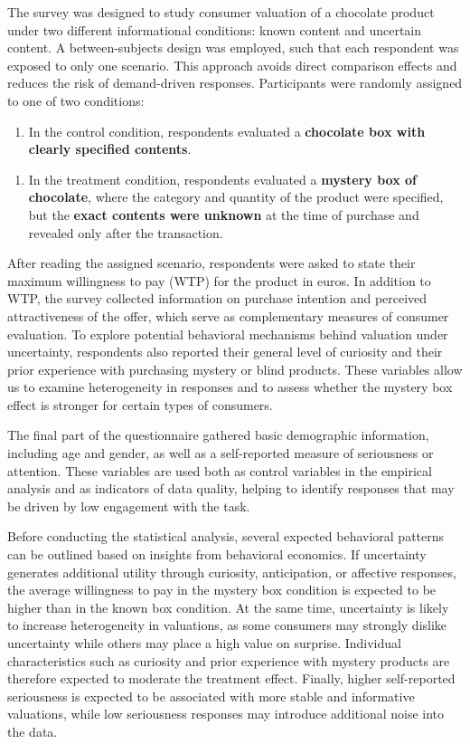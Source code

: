 \documentclass{article}
\begin{document}
The survey was designed to study consumer valuation of a chocolate product under two different informational conditions: known content and uncertain content. A between-subjects design was employed, such that each respondent was exposed to only one scenario. This approach avoids direct comparison effects and reduces the risk of demand-driven responses.
Participants were randomly assigned to one of two conditions: 
\begin{enumerate}
    \item In the control condition, respondents evaluated a \textbf{chocolate box with clearly specified contents}.
\end{enumerate}

\begin{enumerate}
    \item In the treatment condition, respondents evaluated a \textbf{mystery box of chocolate}, where the category and quantity of the product were specified, but the \textbf{exact contents were unknown} at the time of purchase and revealed only after the transaction.
\end{enumerate}

After reading the assigned scenario, respondents were asked to state their maximum willingness to pay (WTP) for the product in euros. In addition to WTP, the survey collected information on purchase intention and perceived attractiveness of the offer, which serve as complementary measures of consumer evaluation. To explore potential behavioral mechanisms behind valuation under uncertainty, respondents also reported their general level of curiosity and their prior experience with purchasing mystery or blind products. These variables allow us to examine heterogeneity in responses and to assess whether the mystery box effect is stronger for certain types of consumers.

The final part of the questionnaire gathered basic demographic information, including age and gender, as well as a self-reported measure of seriousness or attention. These variables are used both as control variables in the empirical analysis and as indicators of data quality, helping to identify responses that may be driven by low engagement with the task.

Before conducting the statistical analysis, several expected behavioral patterns can be outlined based on insights from behavioral economics. If uncertainty generates additional utility through curiosity, anticipation, or affective responses, the average willingness to pay in the mystery box condition is expected to be higher than in the known box condition. At the same time, uncertainty is likely to increase heterogeneity in valuations, as some consumers may strongly dislike uncertainty while others may place a high value on surprise. Individual characteristics such as curiosity and prior experience with mystery products are therefore expected to moderate the treatment effect. Finally, higher self-reported seriousness is expected to be associated with more stable and informative valuations, while low seriousness responses may introduce additional noise into the data.
\end{document}

